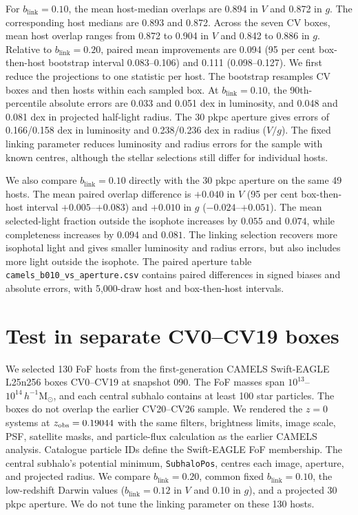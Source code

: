 \documentclass[usenatbib]{mnras}
\begin{document}
For $b_{\mathrm{link}}=0.10$, the mean host-median overlaps are 0.894 in $V$ and 0.872
in $g$. The corresponding host medians are 0.893 and 0.872. Across the
seven CV boxes, mean host overlap ranges from 0.872 to 0.904 in $V$
and 0.842 to 0.886 in $g$. Relative
to $b_{\mathrm{link}}=0.20$, paired mean improvements are 0.094 (95 per cent
box-then-host bootstrap interval 0.083--0.106) and 0.111 (0.098--0.127).
We first reduce the projections to one statistic per host. The bootstrap
resamples CV boxes and then hosts within each sampled box. At $b_{\mathrm{link}}=0.10$, the
90th-percentile absolute errors are 0.033 and 0.051 dex in luminosity,
and 0.048 and 0.081 dex in projected half-light radius. The 30 pkpc
aperture gives errors of 0.166/0.158 dex in luminosity and 0.238/0.236 dex
in radius ($V/g$). The fixed linking parameter reduces luminosity and
radius errors for the sample with known centres, although the stellar
selections still differ for individual hosts.

We also compare $b_{\mathrm{link}}=0.10$ directly with the 30 pkpc aperture on the same
49 hosts. The mean paired overlap difference is $+0.040$ in $V$
(95 per cent box-then-host interval $+0.005$--$+0.083$) and $+0.010$
in $g$ ($-0.024$--$+0.051$). The mean selected-light fraction outside
the isophote increases by $0.055$ and $0.074$, while completeness
increases by $0.094$ and $0.081$. The linking selection recovers more
isophotal light and gives smaller luminosity and radius errors, but also
includes more light outside the isophote. The paired aperture table
\texttt{camels\_b010\_vs\_aperture.csv} contains paired differences in
signed biases and absolute errors, with 5,000-draw host and box-then-host
intervals.

\section{Test in separate CV0--CV19 boxes}

We selected 130 FoF hosts from the first-generation CAMELS Swift-EAGLE
L25n256 boxes CV0--CV19 at snapshot 090. The FoF masses span
$10^{13}$--$10^{14}\,h^{-1}\mathrm{M}_{\odot}$, and each central subhalo
contains at least 100 star particles. The boxes do not overlap the earlier
CV20--CV26 sample. We rendered the $z=0$ systems at
$z_{\rm obs}=0.19044$ with the same filters, brightness limits, image scale,
PSF, satellite masks, and particle-flux calculation as the earlier CAMELS
analysis. Catalogue particle IDs define the Swift-EAGLE FoF membership.
The central subhalo's potential minimum, \texttt{SubhaloPos}, centres each
image, aperture, and projected radius. We compare $b_{\mathrm{link}}=0.20$,
common fixed $b_{\mathrm{link}}=0.10$, the low-redshift Darwin values
($b_{\mathrm{link}}=0.12$ in $V$ and 0.10 in $g$), and a projected 30 pkpc
aperture. We do not tune the linking parameter on these 130 hosts.
\end{document}
